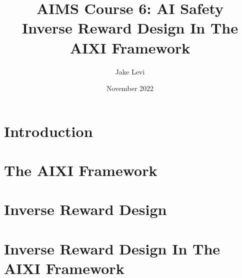 \documentclass{article}
\title{
    AIMS Course 6: AI Safety \\
    \large Inverse Reward Design In The AIXI Framework
}
\author{Jake Levi}
\date{November 2022}
\begin{document}
\maketitle
\section{Introduction} \label{section:intro}

\section{The AIXI Framework}

\section{Inverse Reward Design}

\section{Inverse Reward Design In The AIXI Framework}



\end{document}
